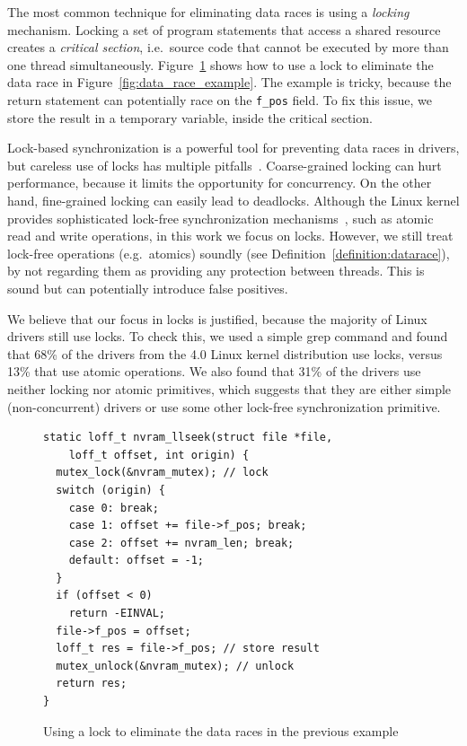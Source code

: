 The most common technique for eliminating data races is using a \emph{locking} mechanism. Locking a set of program statements that access a shared resource creates a \emph{critical section}, i.e.\ source code that cannot be executed by more than one thread simultaneously. Figure~\ref{fig:lock_example} shows how to use a lock to eliminate the data race in Figure~\ref{fig:data_race_example}. The example is tricky, because the return statement can potentially race on the \texttt{f\_pos} field. To fix this issue, we store the result in a temporary variable, inside the critical section.

Lock-based synchronization is a powerful tool for preventing data races in drivers, but careless use of locks has multiple pitfalls~\cite{sutter2005software}. Coarse-grained locking can hurt performance, because it limits the opportunity for concurrency. On the other hand, fine-grained locking can easily lead to deadlocks. Although the Linux kernel provides sophisticated lock-free synchronization mechanisms~\cite{corbet2005linux}, such as atomic read and write operations, in this work we focus on locks. However, we still treat lock-free operations (e.g.\ atomics) soundly (see Definition~\ref{definition:datarace}), by not regarding them as providing any protection between threads. This is sound but can potentially introduce false positives.

We believe that our focus in locks is justified, because the majority of Linux drivers still use locks. To check this, we used a simple grep command and found that 68\% of the drivers from the 4.0 Linux kernel distribution use locks, versus 13\% that use atomic operations. We also found that 31\% of the drivers use neither locking nor atomic primitives, which suggests that they are either simple (non-concurrent) drivers or use some other lock-free synchronization primitive.

\begin{figure}[t]
\begin{lstlisting}
static loff_t nvram_llseek(struct file *file,
    loff_t offset, int origin) {
  mutex_lock(&nvram_mutex); // lock
  switch (origin) {
    case 0: break;
    case 1: offset += file->f_pos; break;
    case 2: offset += nvram_len; break;
    default: offset = -1;
  }
  if (offset < 0)
    return -EINVAL;
  file->f_pos = offset;
  loff_t res = file->f_pos; // store result
  mutex_unlock(&nvram_mutex); // unlock
  return res;
}
\end{lstlisting}
\caption{Using a lock to eliminate the data races in the previous example}
\label{fig:lock_example}
\end{figure}

